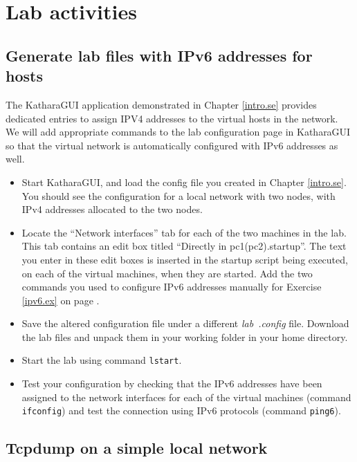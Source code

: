 \documentclass[12pt]{book}
\begin{document}
\section{Lab activities}

\subsection{Generate lab files with IPv6 addresses for
  hosts}\label{2nodes-ipv6.se} 

The KatharaGUI application demonstrated in Chapter \ref{intro.se}
provides dedicated entries to assign IPV4 addresses to the virtual
hosts in the network. We will add appropriate commands to the lab
configuration page in KatharaGUI so that the virtual network is
automatically configured with IPv6 addresses as well.

\begin{itemize}[--]
\item Start KatharaGUI, and load the config file you created in
  Chapter \ref{intro.se}. You should see the configuration for a local
  network with two nodes, with IPv4 addresses allocated to the two
  nodes.
  \item Locate the ``Network interfaces'' tab for each of the two
    machines in the lab. This tab contains an edit box titled
    ``Directly in pc1(pc2).startup''. The text you enter in these edit
    boxes is inserted in the startup script being executed, on each
    of the virtual machines, when they are started. Add the two
    commands you used to configure IPv6 addresses manually for
    Exercise \ref{ipv6.ex} on page \pageref*{ipv6.ex}.
  \item Save the altered configuration file under a different
    \emph{lab~.config} file. Download the lab files and unpack them in
    your working folder in your home directory.
  \item Start the lab using command \verb$lstart$.
  \item Test your configuration by checking that the IPv6 addresses
    have been assigned to the network interfaces for each of the
    virtual machines (command \verb$ifconfig$) and test the connection
    using IPv6 protocols (command \verb$ping6$).
\end{itemize}

\subsection{Tcpdump on a simple local network}
\end{document}
